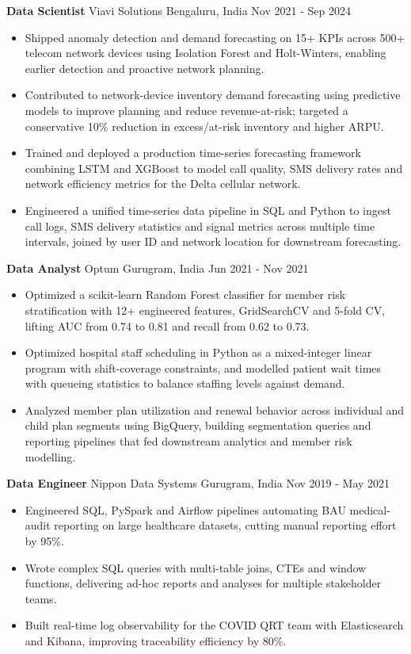\documentclass[10pt,a4paper]{article}
\newcommand{\role}[4]{\textbf{#1} \textbar{} #2 \hfill #3 \textbar{} #4\par}
\begin{document}
\vspace{3pt}
\role{Data Scientist}{Viavi Solutions}{Bengaluru, India}{Nov 2021 - Sep 2024}
\begin{itemize}
  \item Shipped anomaly detection and demand forecasting on 15+ KPIs across 500+ telecom network devices using Isolation Forest and Holt-Winters, enabling earlier detection and proactive network planning.
  \item Contributed to network-device inventory demand forecasting using predictive models to improve planning and reduce revenue-at-risk; targeted a conservative 10\% reduction in excess/at-risk inventory and higher ARPU.
  \item Trained and deployed a production time-series forecasting framework combining LSTM and XGBoost to model call quality, SMS delivery rates and network efficiency metrics for the Delta cellular network.
  \item Engineered a unified time-series data pipeline in SQL and Python to ingest call logs, SMS delivery statistics and signal metrics across multiple time intervals, joined by user ID and network location for downstream forecasting.
\end{itemize}
\vspace{3pt}
\role{Data Analyst}{Optum}{Gurugram, India}{Jun 2021 - Nov 2021}
\begin{itemize}
  \item Optimized a scikit-learn Random Forest classifier for member risk stratification with 12+ engineered features, GridSearchCV and 5-fold CV, lifting AUC from 0.74 to 0.81 and recall from 0.62 to 0.73.
  \item Optimized hospital staff scheduling in Python as a mixed-integer linear program with shift-coverage constraints, and modelled patient wait times with queueing statistics to balance staffing levels against demand.
  \item Analyzed member plan utilization and renewal behavior across individual and child plan segments using BigQuery, building segmentation queries and reporting pipelines that fed downstream analytics and member risk modelling.
\end{itemize}
\vspace{3pt}
\role{Data Engineer}{Nippon Data Systems}{Gurugram, India}{Nov 2019 - May 2021}
\begin{itemize}
  \item Engineered SQL, PySpark and Airflow pipelines automating BAU medical-audit reporting on large healthcare datasets, cutting manual reporting effort by 95\%.
  \item Wrote complex SQL queries with multi-table joins, CTEs and window functions, delivering ad-hoc reports and analyses for multiple stakeholder teams.
  \item Built real-time log observability for the COVID QRT team with Elasticsearch and Kibana, improving traceability efficiency by 80\%.
\end{itemize}
\end{document}
